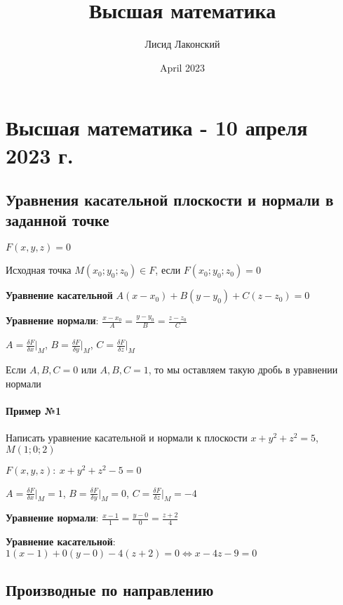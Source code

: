\documentclass{article}
\title{Высшая математика}
\author{Лисид Лаконский}
\date{April 2023}
\begin{document}
\raggedright

\maketitle

\tableofcontents
\pagebreak

\section{Высшая математика - 10 апреля 2023 г.}

\subsection{Уравнения касательной плоскости и нормали в заданной точке}

$F(x, y, z) = 0$

Исходная точка $M(x_0; y_0; z_0) \in F$, если $F(x_0; y_0; z_0) = 0$

\hfill

\textbf{Уравнение касательной} $A(x - x_0) + B(y - y_0) + C(z - z_0) = 0$

\textbf{Уравнение нормали}: $\frac{x - x_0}{A} = \frac{y - y_0}{B} = \frac{z - z_0}{C}$

\hfill

$A = \frac{\delta F}{\delta x} \bigg|_{M}$, $B = \frac{\delta F}{\delta y} \bigg|_{M}$, $C = \frac{\delta F}{\delta z} \bigg|_{M}$

Если $A, B, C = 0$ или $A, B, C = 1$, то мы оставляем такую дробь в уравнении нормали

\paragraph{Пример №1} Написать уравнение касательной и нормали к плоскости $x + y^2 + z^2 = 5$, $M(1; 0; 2)$

$F(x, y, z): \ x + y^2 + z^2 - 5 = 0$

$A = \frac{\delta F}{\delta x} \bigg|_{M} = 1$, $B = \frac{\delta F}{\delta y} \bigg|_{M} = 0$, $C = \frac{\delta F}{\delta z} \bigg|_{M} = -4$

\textbf{Уравнение нормали}: $\frac{x - 1}{1} = \frac{y - 0}{0} = \frac{z + 2}{4}$

\textbf{Уравнение касательной}: $1 (x - 1) + 0 (y - 0) - 4 (z + 2) = 0 \Longleftrightarrow x - 4z - 9 = 0$

\subsection{Производные по направлению}
\end{document}
